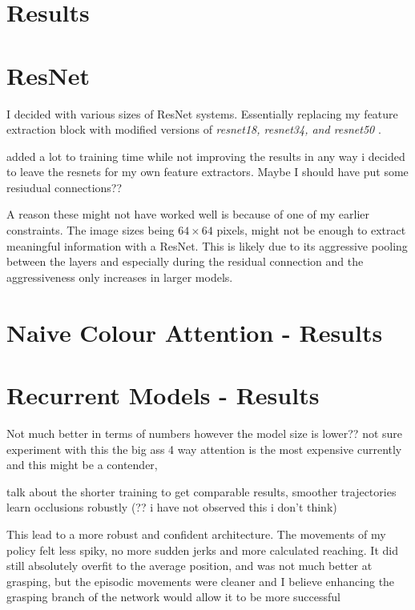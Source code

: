 \section{Results}





\section{ResNet}
I decided with various sizes of ResNet systems. Essentially replacing my feature extraction block with modified versions of \emph{resnet18, resnet34, and resnet50} .

added a lot to training time while not improving the results in any way i decided to leave the resnets for my own feature extractors. Maybe I should have put some resiudual connections??

A reason these might not have worked well is because of one of my earlier constraints. The image sizes being \(64 \times 64\) pixels, might not be enough to extract meaningful information with a ResNet. This is likely due to its aggressive pooling between the layers and especially during the residual connection and the aggressiveness only increases in larger models.  



\section{Naive Colour Attention - Results}
\section{Recurrent Models - Results}
Not much better in terms of numbers however the model size is lower?? not sure experiment with this the big ass 4 way attention is the most expensive currently and this might be a contender,

talk about the shorter training to get comparable results, smoother trajectories learn occlusions robustly (?? i have not observed this i don't think)


This lead to a more robust and confident architecture. The movements of my policy felt less spiky, no more sudden jerks and more calculated reaching. It did still absolutely overfit to the average position, and was not much better at grasping, but the episodic movements were cleaner and I believe enhancing the grasping branch of the network would allow it to be more successful 
